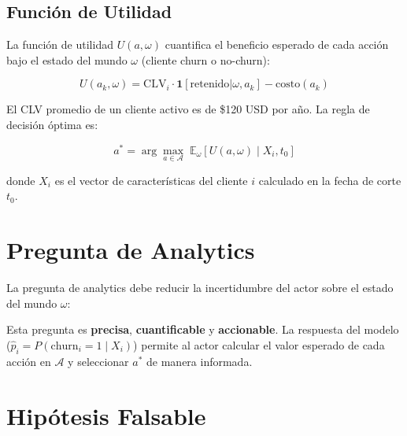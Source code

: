 \documentclass[12pt,a4paper]{article}
\begin{document}
\subsection{Función de Utilidad}

La función de utilidad $U(a, \omega)$ cuantifica el beneficio esperado de cada acción bajo el estado del mundo $\omega$ (cliente churn o no-churn):

\begin{equation}
U(a_k, \omega) = \text{CLV}_i \cdot \mathbf{1}[\text{retenido}|\omega, a_k] - \text{costo}(a_k)
\end{equation}

El CLV promedio de un cliente activo es de \$120 USD por año. La regla de decisión óptima es:

\begin{equation}
a^* = \arg\max_{a \in \mathcal{A}} \; \mathbb{E}_\omega[U(a, \omega) \mid X_i, t_0]
\end{equation}

donde $X_i$ es el vector de características del cliente $i$ calculado en la fecha de corte $t_0$.

\newpage

\section{Pregunta de Analytics}

La pregunta de analytics debe reducir la incertidumbre del actor sobre el estado del mundo $\omega$:

\begin{center}
\end{center}

Esta pregunta es \textbf{precisa}, \textbf{cuantificable} y \textbf{accionable}. La respuesta del modelo ($\hat{p}_i = P(\text{churn}_i = 1 \mid X_i)$) permite al actor calcular el valor esperado de cada acción en $\mathcal{A}$ y seleccionar $a^*$ de manera informada.

\newpage

\section{Hipótesis Falsable}
\end{document}
